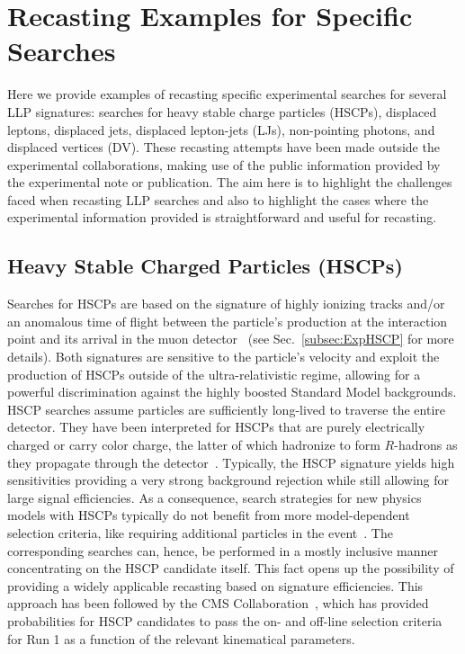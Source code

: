 \section{Recasting Examples for Specific Searches}
\label{sec:ch5-recastExamples}

Here we provide examples of recasting specific experimental
searches for several LLP signatures: searches for heavy stable charge particles (HSCPs), displaced
leptons, displaced jets, displaced lepton-jets (LJs), non-pointing photons, and displaced vertices (DV).
These recasting attempts have been made outside the experimental collaborations,
making use of the public information provided by the experimental note or
publication. The aim here is to highlight the challenges faced when recasting
LLP searches and also to highlight the cases where the
experimental information provided is straightforward and useful for
recasting.

\subsection{Heavy Stable Charged Particles (HSCPs)}
\label{sec:ch5-HSCPs}

\renewcommand{\vec}[1]{\boldsymbol{#1}}
%

Searches for HSCPs are based on the signature
of highly ionizing tracks and/or an anomalous time of flight between 
the particle's production at the interaction point and its arrival in the
muon detector~\cite{Fairbairn:2006gg} (see Sec.~\ref{subsec:ExpHSCP} for more details).
Both signatures are sensitive to the particle's velocity and exploit the
production of HSCPs outside of the ultra-relativistic regime,
allowing for a powerful discrimination against the highly boosted Standard Model backgrounds.
HSCP searches assume particles are sufficiently long-lived to traverse
the entire detector.
They have been interpreted for HSCPs that are 
purely electrically charged or carry color charge, the latter of which hadronize to form
$R$-hadrons as they propagate through the detector~\cite{Farrar:1978xj}.
Typically, the HSCP signature yields high sensitivities providing
a very strong background rejection while still allowing for large
signal efficiencies.
As a consequence, search strategies for new physics models with HSCPs
typically do not benefit from more model-dependent selection criteria, like requiring additional
particles in the event~\cite{Heisig:2012zq}. The corresponding searches can, hence, be
performed in a mostly inclusive manner concentrating on the HSCP candidate itself.
This fact opens up the possibility of providing a widely applicable recasting based on signature
efficiencies. This approach has been followed by the CMS
Collaboration~\cite{Khachatryan:2015lla},
which has provided probabilities for HSCP candidates to pass the on- and
off-line selection criteria for Run 1 as a function of the relevant kinematical parameters.

